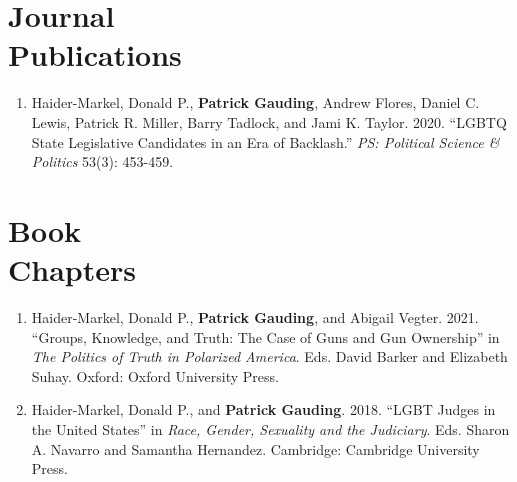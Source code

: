 \documentclass[margin,line,pifont,palatino,courier]{res}
\begin{document}
\begin{resume}
\section{\sc Journal \\Publications}

\begin{enumerate}
  
\item Haider-Markel, Donald P., \textbf{Patrick Gauding}, Andrew Flores,
Daniel C. Lewis, Patrick R. Miller, Barry Tadlock, and Jami
K. Taylor. 2020. ``LGBTQ State Legislative Candidates in an Era
of Backlash.'' \emph{PS: Political Science \& Politics} 53(3): 453-459.


\end{enumerate}

\section{\sc Book \\Chapters}

\begin{enumerate}

\item Haider-Markel, Donald P., \textbf{Patrick Gauding}, and Abigail
  Vegter. 2021. ``Groups, Knowledge, and Truth: The Case of Guns and Gun
  Ownership'' in \textit{The Politics of Truth in Polarized
    America}. Eds. David Barker and Elizabeth Suhay. Oxford: Oxford
  University Press.

\item Haider-Markel, Donald P., and \textbf{Patrick Gauding}. 2018. ``LGBT Judges
in the United States'' in \textit{Race, Gender, Sexuality and the
  Judiciary}. Eds. Sharon A. Navarro  and Samantha
Hernandez. Cambridge: Cambridge University Press.

\end{enumerate}





\end{resume}
\end{document}

